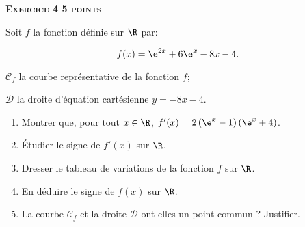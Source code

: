 \textbf{\large\textsc{Exercice 4 \hfill 5 points}}

\bigskip

Soit $f$ la fonction définie sur $\R$ par: 

\[f(x)=\e^{2x} + 6 \e^{x} - 8x-4.\]

\begin{list}{\textbullet}{Dans le plan rapporté à un repère orthogonal, on considère:}
\item $\mathcal{C}_f$ la courbe représentative de la fonction $f$;
\item $\mathcal{D}$ la droite d'équation cartésienne $y=-8x-4$.
\end{list}

\medskip

\begin{enumerate}
\item Montrer que, pour tout $x \in \R$, $f'(x)=2\left (\e^{x}-1\right )\left (\e^{x}+4\right )$.
\item Étudier le signe de $f'(x)$ sur $\R$.
\item Dresser le tableau de variations de la fonction $f$ sur $\R$.
\item En déduire le signe de $f(x)$ sur $\R$.
\item La courbe $\mathcal{C}_f$ et la droite $\mathcal{D}$ ont-elles un point commun ? Justifier.
\end{enumerate}

